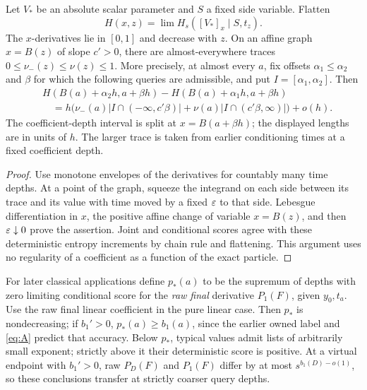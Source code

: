 \begin{lemma}\label{names:mixed-trace}
Let \(V_*\) be an absolute scalar parameter and \(S\) a fixed side
variable. Flatten
\[
 H(x,z)=\lim H_s([V_*]_x\mid S,t_z).
\]
The \(x\)-derivatives lie in \([0,1]\) and decrease with \(z\).
On an affine graph \(x=B(z)\) of slope \(c'>0\), there are
almost-everywhere traces \(0\leq\nu_-(z)\leq\nu(z)\leq1\).
More precisely, at almost every \(a\), fix offsets
\(\alpha_1\leq\alpha_2\) and \(\beta\) for which the following
queries are admissible, and put \(I=[\alpha_1,\alpha_2]\). Then
\[
\begin{split}
 &H(B(a)+\alpha_2h,a+\beta h)
       -H(B(a)+\alpha_1h,a+\beta h)\\
 &\quad=h\bigl(\nu_-(a)|I\cap(-\infty,c'\beta)|
             +\nu(a)|I\cap(c'\beta,\infty)|\bigr)+o(h).
\end{split}
\]
The coefficient-depth interval is split at \(x=B(a+\beta h)\);
the displayed lengths are in units of \(h\). The larger trace is taken from
earlier conditioning times at a fixed coefficient depth.
\end{lemma}

\begin{proof}
Use monotone envelopes of the derivatives for countably many time
depths. At a point of the graph, squeeze the integrand on each
side between its trace and its value with time moved by a fixed
\(\varepsilon\) to that side. Lebesgue differentiation in \(x\), the
positive affine change of variable \(x=B(z)\), and then
\(\varepsilon\downarrow0\) prove the assertion. Joint and conditional
scores agree with these deterministic entropy increments by chain
rule and flattening. This argument uses no regularity of a
coefficient as a function of the exact particle.
\end{proof}

For later classical applications define \(p_*(a)\) to be the
supremum of depths with zero limiting conditional score for the
\emph{raw final} derivative \(P_1(F)\), given \(y_0,t_a\).
Use the raw final linear coefficient in the pure linear case.
Then \(p_*\) is nondecreasing; if \(b_1'>0\),
\(p_*(a)\geq b_1(a)\), since the earlier owned label and
\eqref{eq:A} predict that accuracy. Below \(p_*\), typical values
admit lists of arbitrarily small exponent; strictly above it their
deterministic score is positive. At a virtual endpoint with
\(b_1'>0\), raw \(P_D(F)\) and \(P_1(F)\) differ by at most
\(s^{b_1(D)-o(1)}\), so these conclusions transfer at strictly
coarser query depths.

